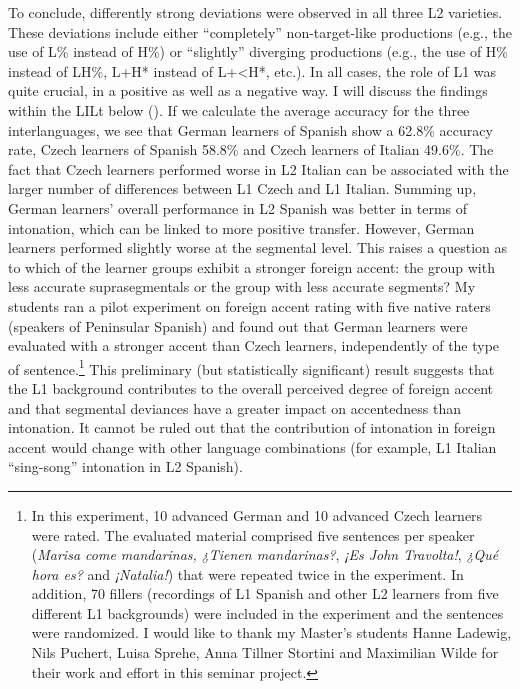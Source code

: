 To conclude, differently strong deviations were observed in all three L2 varieties. These deviations include either “completely” non-target-like productions (e.g., the use of L\% instead of H\%) or “slightly” diverging productions (e.g., the use of H\% instead of LH\%, L+H* instead of L+<H*, etc.). In all cases, the role of L1 was quite crucial, in a positive as well as a negative way. I will discuss the findings within the LILt below (). If we calculate the average accuracy for the three interlanguages, we see that German learners of Spanish show a 62.8\% accuracy rate, Czech learners of Spanish 58.8\% and Czech learners of Italian 49.6\%. The fact that Czech learners performed worse in L2 Italian can be associated with the larger number of differences between L1 Czech and L1 Italian. Summing up, German learners’ overall performance in L2 Spanish was better in terms of intonation, which can be linked to more positive transfer. However, German learners performed slightly worse at the segmental level. This raises a question as to which of the learner groups exhibit a stronger foreign accent: the group with less accurate suprasegmentals or the group with less accurate segments? My students ran a pilot experiment on foreign accent rating with five native raters (speakers of Peninsular Spanish) and found out that German learners were evaluated with a stronger accent than Czech learners, independently of the type of sentence.\footnote{In this experiment, 10 advanced German and 10 advanced Czech learners were rated. The evaluated material comprised five sentences per speaker (\textit{Marisa come mandarinas,} \textit{¿Tienen mandarinas?}, \textit{¡Es John Travolta!}, \textit{¿Qué hora es?} and \textit{¡Natalia!}) that were repeated twice in the experiment. In addition, 70 fillers (recordings of L1 Spanish and other L2 learners from five different L1 backgrounds) were included in the experiment and the sentences were randomized. I would like to thank my Master’s students Hanne Ladewig, Nils Puchert, Luisa Sprehe, Anna Tillner Stortini and Maximilian Wilde for their work and effort in this seminar project.} This preliminary (but statistically significant) result suggests that the L1 background contributes to the overall perceived degree of foreign accent and that segmental deviances have a greater impact on accentedness than intonation. It cannot be ruled out that the contribution of intonation in foreign accent would change with other language combinations (for example, L1 Italian “sing-song” intonation in L2 Spanish).


